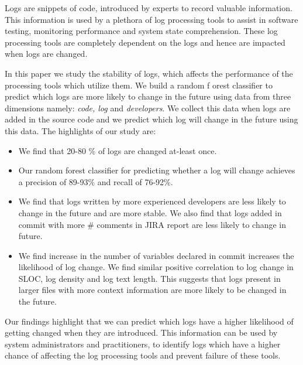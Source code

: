 Logs are snippets of code, introduced by experts to record valuable information. This information is used by a plethora of log processing tools to assist in software testing, monitoring performance and system state comprehension. These log processing tools are completely dependent on the logs and hence are impacted when logs are changed.

 In this paper we study the stability of logs, which affects the performance of the processing tools which utilize them. We build a random f orest classifier to predict which logs are more likely to change in the future using data from three dimensions namely: \emph{code, log} and \emph{developers}. We collect this data when logs are added in the source code and we predict which log will change in the future using this data. The highlights of our study are:

\begin{itemize}
	\item We find that 20-80 \% of logs are changed at-least once.
	\item Our random forest classifier for predicting whether a log will change achieves a precision of 89-93\% and recall of 76-92\%. 
	\item We find that logs written by more experienced developers are less likely to change in the future and are more stable. We also find that logs added in commit with more \# comments in JIRA report are less likely to change in future.
	\item We find increase in the number of variables declared in commit increases the likelihood of log change. We find similar positive correlation to log change in SLOC, log density and log text length. This suggests that logs present in larger files with more context information are more likely to be changed in the future.
	
\end{itemize}

Our findings highlight that we can predict which logs have a higher likelihood of getting changed when they are introduced. This information can be used by system administrators and practitioners, to identify logs which have a higher chance of affecting the log processing tools and prevent failure of these tools.  



